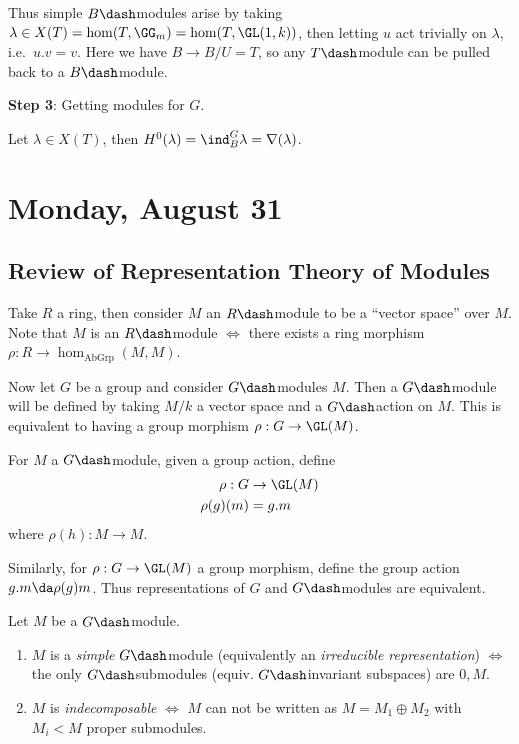 Thus simple \(B\dash\)modules arise by taking
\(\lambda \in X(T) = \hom(T, \GG_m) = \hom(T, \GL(1, k))\), then letting
\(u\) act trivially on \(\lambda\), i.e.~\(u.v = v\). Here we have
\(B \to B/U = T\), so any \(T\dash\)module can be pulled back to a
\(B\dash\)module.

\textbf{Step 3}: Getting modules for \(G\).

Let \(\lambda \in X(T)\), then
\(H^0(\lambda) = \ind_B^G \lambda = \nabla(\lambda)\).

\hypertarget{monday-august-31}{%
\section{Monday, August 31}\label{monday-august-31}}

\hypertarget{review-of-representation-theory-of-modules}{%
\subsection{Review of Representation Theory of
Modules}\label{review-of-representation-theory-of-modules}}

Take \(R\) a ring, then consider \(M\) an \(R\dash\)module to be a
``vector space'' over \(M\). Note that \(M\) is an \(R\dash\)module
\(\iff\) there exists a ring morphism
\(\rho: R\to \hom_{\text{AbGrp}}(M, M)\).

Now let \(G\) be a group and consider \(G\dash\)modules \(M\). Then a
\(G\dash\)module will be defined by taking \(M/k\) a vector space and a
\(G\dash\)action on \(M\). This is equivalent to having a group morphism
\(\rho: G\to \GL(M)\).

For \(M\) a \(G\dash\)module, given a group action, define
\begin{align*}  
\rho: G&\to \GL(M) \\
\rho(g)(m) &= g.m
\end{align*} where \(\rho(h): M\to M\).

Similarly, for \(\rho: G\to \GL(M)\) a group morphism, define the group
action \(g.m \da \rho(g)m\). Thus representations of \(G\) and
\(G\dash\)modules are equivalent.

\begin{definition}[?]

Let \(M\) be a \(G\dash\)module.

\begin{enumerate}
\def\labelenumi{\arabic{enumi}.}
\item
  \(M\) is a \emph{simple} \(G\dash\)module (equivalently an
  \emph{irreducible representation}) \(\iff\) the only
  \(G\dash\)submodules (equiv. \(G\dash\)invariant subspaces) are
  \(0, M\).
\item
  \(M\) is \emph{indecomposable} \(\iff\) \(M\) can not be written as
  \(M = M_1 \oplus M_2\) with \(M_i < M\) proper submodules.
\end{enumerate}

\end{definition}

